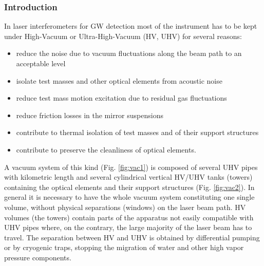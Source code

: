 

\subsubsection{Introduction}  \label{intro}
%
In laser interferometers for GW detection most of the instrument has to be kept under High-Vacuum or Ultra-High-Vacuum (HV, UHV) for several reasons:
\begin{itemize}
\item reduce the noise due to vacuum fluctuations along the beam path to an acceptable level
\item isolate test masses and other optical elements from acoustic noise
\item reduce test mass motion excitation due to residual gas fluctuations
\item reduce friction losses in the mirror suspensions
\item contribute to thermal isolation of test masses and of their support structures
\item contribute to preserve the cleanliness of optical elements.
\end{itemize}


A vacuum system of this kind (Fig.  \ref{fig:vac1}) is composed of several UHV pipes with kilometric length and several cylindrical vertical HV/UHV tanks (towers) containing the optical elements and their support structures (Fig. \ref{fig:vac2}). In general it is necessary to have the whole vacuum system constituting one single volume, without physical separations (windows) on the laser beam path. HV volumes (the towers) contain parts of the apparatus not easily compatible with UHV pipes where, on the contrary, the large majority of the laser beam has to travel. The separation between HV and UHV is obtained by differential pumping or by cryogenic traps, stopping the migration of water and other high vapor pressure components.

